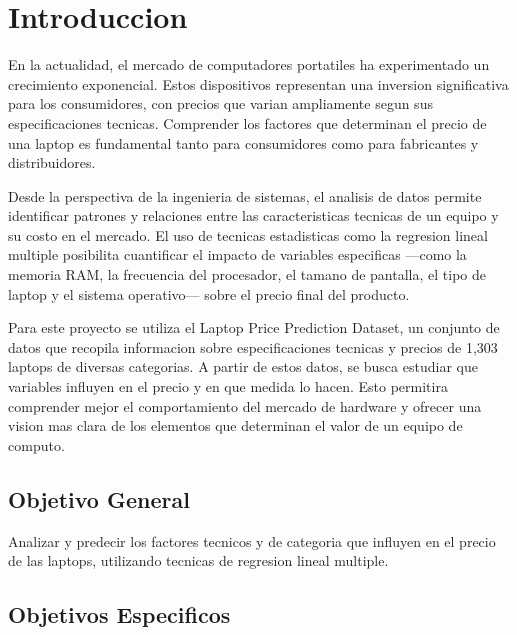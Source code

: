 \documentclass[12pt,a4paper]{article}
\begin{document}
\newpage
\tableofcontents
\newpage

\section{Introduccion}

En la actualidad, el mercado de computadores portatiles ha experimentado un crecimiento exponencial. Estos dispositivos representan una inversion significativa para los consumidores, con precios que varian ampliamente segun sus especificaciones tecnicas. Comprender los factores que determinan el precio de una laptop es fundamental tanto para consumidores como para fabricantes y distribuidores.

Desde la perspectiva de la ingenieria de sistemas, el analisis de datos permite identificar patrones y relaciones entre las caracteristicas tecnicas de un equipo y su costo en el mercado. El uso de tecnicas estadisticas como la regresion lineal multiple posibilita cuantificar el impacto de variables especificas ---como la memoria RAM, la frecuencia del procesador, el tamano de pantalla, el tipo de laptop y el sistema operativo--- sobre el precio final del producto.

Para este proyecto se utiliza el Laptop Price Prediction Dataset, un conjunto de datos que recopila informacion sobre especificaciones tecnicas y precios de 1,303 laptops de diversas categorias. A partir de estos datos, se busca estudiar que variables influyen en el precio y en que medida lo hacen. Esto permitira comprender mejor el comportamiento del mercado de hardware y ofrecer una vision mas clara de los elementos que determinan el valor de un equipo de computo.

\subsection{Objetivo General}

Analizar y predecir los factores tecnicos y de categoria que influyen en el precio de las laptops, utilizando tecnicas de regresion lineal multiple.

\subsection{Objetivos Especificos}
\end{document}

